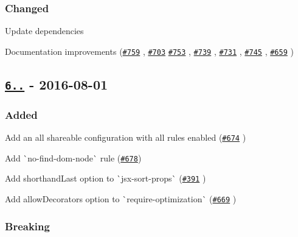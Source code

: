 \subsubsection*{Changed}


\begin{DoxyItemize}
\item Update dependencies
\item Documentation improvements (\href{https://github.com/yannickcr/eslint-plugin-react/pull/759}{\tt \#759} , \href{https://github.com/yannickcr/eslint-plugin-react/pull/703}{\tt \#703} \href{https://github.com/yannickcr/eslint-plugin-react/pull/753}{\tt \#753} , \href{https://github.com/yannickcr/eslint-plugin-react/issues/739}{\tt \#739} , \href{https://github.com/yannickcr/eslint-plugin-react/pull/731}{\tt \#731} , \href{https://github.com/yannickcr/eslint-plugin-react/pull/745}{\tt \#745} , \href{https://github.com/yannickcr/eslint-plugin-react/pull/659}{\tt \#659} )
\end{DoxyItemize}

\subsection*{\href{https://github.com/yannickcr/eslint-plugin-react/compare/v5.2.2...v6.0.0}{\tt 6..} -\/ 2016-\/08-\/01}

\subsubsection*{Added}


\begin{DoxyItemize}
\item Add an {\ttfamily all} shareable configuration with all rules enabled (\href{https://github.com/yannickcr/eslint-plugin-react/issues/674}{\tt \#674} )
\item Add \`{}no-\/find-\/dom-\/node\`{} rule (\href{https://github.com/yannickcr/eslint-plugin-react/issues/678}{\tt \#678})
\item Add {\ttfamily shorthand\+Last} option to \`{}jsx-\/sort-\/props\`{} (\href{https://github.com/yannickcr/eslint-plugin-react/issues/391}{\tt \#391} )
\item Add {\ttfamily allow\+Decorators} option to \`{}require-\/optimization\`{} (\href{https://github.com/yannickcr/eslint-plugin-react/pull/669}{\tt \#669} )
\end{DoxyItemize}

\subsubsection*{Breaking}


